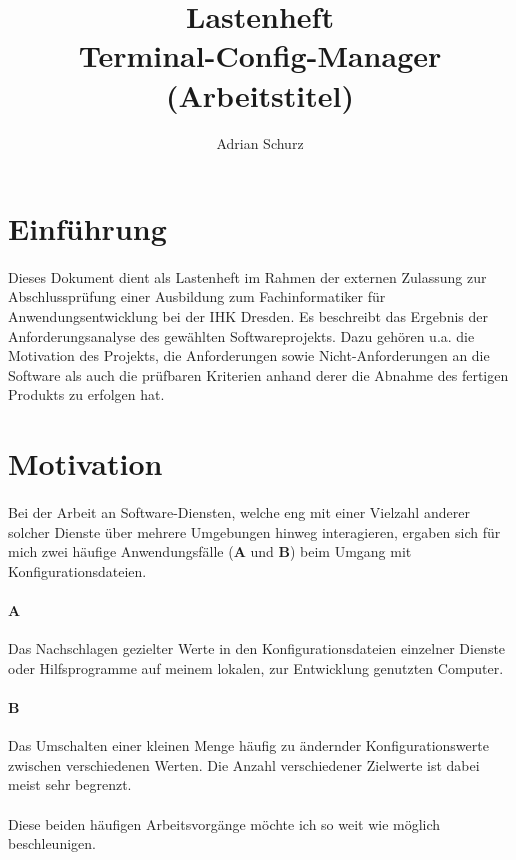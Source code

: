 \documentclass[a4paper,11pt]{article}
\author{Adrian Schurz}
\title{Lastenheft\\[0.2em]\smaller{}Terminal-Config-Manager (Arbeitstitel)}
\begin{document}
\maketitle
{}
\newpage
{}
\tableofcontents

\section{Einführung}
\paragraph{}
Dieses Dokument dient als Lastenheft im Rahmen der externen Zulassung
zur Abschlussprüfung einer Ausbildung zum Fachinformatiker für
Anwendungsentwicklung bei der IHK Dresden. Es beschreibt das Ergebnis der
Anforderungsanalyse des gewählten Softwareprojekts. Dazu gehören u.a. die
Motivation des Projekts, die Anforderungen sowie Nicht-Anforderungen an
die Software als auch die prüfbaren Kriterien anhand derer die Abnahme des
fertigen Produkts zu erfolgen hat.

\section{Motivation}
\paragraph{}
Bei der Arbeit an Software-Diensten, welche eng mit einer Vielzahl anderer
solcher Dienste über mehrere Umgebungen hinweg interagieren, ergaben sich
für mich zwei häufige Anwendungsfälle (\textbf{A} und \textbf{B}) beim Umgang mit
Konfigurationsdateien.
\paragraph{A}
Das Nachschlagen gezielter Werte in den Konfigurationsdateien
einzelner Dienste oder Hilfsprogramme auf meinem lokalen, zur Entwicklung
genutzten Computer.
\paragraph{B}
Das Umschalten einer kleinen Menge häufig zu ändernder Konfigurationswerte
zwischen verschiedenen Werten. Die Anzahl verschiedener Zielwerte ist dabei
meist sehr begrenzt.
\paragraph{}
Diese beiden häufigen Arbeitsvorgänge möchte ich so weit wie möglich beschleunigen.
\end{document}
